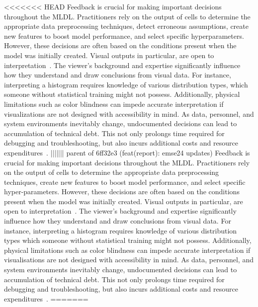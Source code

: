 <<<<<<< HEAD
Feedback is crucial for making important decisions throughout the MLDL. Practitioners rely on the output of cells to determine the appropriate data preprocessing techniques, detect erroneous assumptions, create new features to boost model performance, and select specific hyperparameters. However, these decisions are often based on the conditions present when the model was initially created. Visual outputs in particular, are open to interpretation~\cite{heer2010tour}. The viewer's background and expertise significantly influence how they understand and draw conclusions from visual data. 
For instance, interpreting a histogram requires knowledge of various distribution types, which someone without statistical training might not possess. Additionally, physical limitations such as color blindness can impede accurate interpretation if visualizations are not designed with accessibility in mind. As data, personnel, and system environments inevitably change, undocumented decisions can lead to accumulation of technical debt. This not only prolongs time required for debugging and troubleshooting, but also incurs additional costs and resource expenditures~\cite{sculley2015hidden,amershi2019software,sambasivan2021everyone}.
||||||| parent of 6ff32e3 (feat(report): emse24 updates)
Feedback is crucial for making important decisions throughout the MLDL. Practitioners rely on the output of cells to determine the appropriate data preprocessing techniques, create new features to boost model performance, and select specific hyper-parameters. However, these decisions are often based on the conditions present when the model was initially created. Visual outputs in particular, are open to interpretation~\cite{heer2010tour}. The viewer's background and expertise significantly influence how they understand and draw conclusions from visual data. For instance, interpreting a histogram requires knowledge of various distribution types which someone without statistical training might not possess. Additionally, physical limitations such as color blindness can impede accurate interpretation if visualisations are not designed with accessibility in mind. As data, personnel, and system environments inevitably change, undocumented decisions can lead to accumulation of technical debt. This not only prolongs time required for debugging and troubleshooting, but also incurs additional costs and resource expenditures~\cite{sculley2015hidden,amershi2019software,sambasivan2021everyone}.
=======
